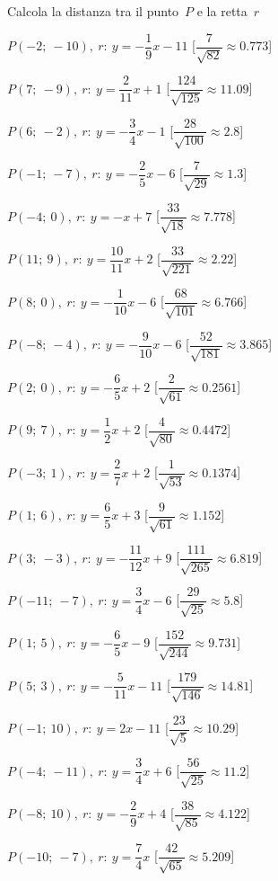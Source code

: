 \begin{esercizio}\label{ese:}
 Calcola la distanza tra il punto~$P$ e la retta~$r$
 \begin{enumeratea}
  \item  $P(-2;~-10),~r:~y = -\dfrac{1}{9} x -11$ \hfill 
   [$\dfrac{7}{\sqrt{82}}\approx 0.773$]
  \item  $P(7;~-9),~r:~y = \dfrac{2}{11} x +1$ \hfill 
   [$\dfrac{124}{\sqrt{125}}\approx 11.09$]
  \item  $P(6;~-2),~r:~y = -\dfrac{3}{4} x -1$ \hfill 
   [$\dfrac{28}{\sqrt{100}}\approx   2.8$]
  \item  $P(-1;~-7),~r:~y = -\dfrac{2}{5} x -6$ \hfill 
   [$\dfrac{7}{\sqrt{29}}\approx   1.3$]
  \item  $P(-4;~0),~r:~y = - x +7$ \hfill 
   [$\dfrac{33}{\sqrt{18}}\approx 7.778$]
  \item  $P(11;~9),~r:~y = \dfrac{10}{11} x +2$ \hfill 
   [$\dfrac{33}{\sqrt{221}}\approx  2.22$]
  \item  $P(8;~0),~r:~y = -\dfrac{1}{10} x -6$ \hfill 
   [$\dfrac{68}{\sqrt{101}}\approx 6.766$]
  \item  $P(-8;~-4),~r:~y = -\dfrac{9}{10} x -6$ \hfill 
   [$\dfrac{52}{\sqrt{181}}\approx 3.865$]
  \item  $P(2;~0),~r:~y = -\dfrac{6}{5} x +2$ \hfill 
   [$\dfrac{2}{\sqrt{61}}\approx0.2561$]
  \item  $P(9;~7),~r:~y = \dfrac{1}{2} x +2$ \hfill 
   [$\dfrac{4}{\sqrt{80}}\approx0.4472$]
  \item  $P(-3;~1),~r:~y = \dfrac{2}{7} x +2$ \hfill 
   [$\dfrac{1}{\sqrt{53}}\approx0.1374$]
  \item  $P(1;~6),~r:~y = \dfrac{6}{5} x +3$ \hfill 
   [$\dfrac{9}{\sqrt{61}}\approx 1.152$]
  \item  $P(3;~-3),~r:~y = -\dfrac{11}{12} x +9$ \hfill 
   [$\dfrac{111}{\sqrt{265}}\approx 6.819$]
  \item  $P(-11;~-7),~r:~y = \dfrac{3}{4} x -6$ \hfill 
   [$\dfrac{29}{\sqrt{25}}\approx   5.8$]
  \item  $P(1;~5),~r:~y = -\dfrac{6}{5} x -9$ \hfill 
   [$\dfrac{152}{\sqrt{244}}\approx 9.731$]
  \item  $P(5;~3),~r:~y = -\dfrac{5}{11} x -11$ \hfill 
   [$\dfrac{179}{\sqrt{146}}\approx 14.81$]
  \item  $P(-1;~10),~r:~y = 2 x -11$ \hfill 
   [$\dfrac{23}{\sqrt{5}}\approx 10.29$]
  \item  $P(-4;~-11),~r:~y = \dfrac{3}{4} x +6$ \hfill 
   [$\dfrac{56}{\sqrt{25}}\approx  11.2$]
  \item  $P(-8;~10),~r:~y = -\dfrac{2}{9} x +4$ \hfill 
   [$\dfrac{38}{\sqrt{85}}\approx 4.122$]
  \item  $P(-10;~-7),~r:~y = \dfrac{7}{4} x $ \hfill 
   [$\dfrac{42}{\sqrt{65}}\approx 5.209$]
 \end{enumeratea}
\end{esercizio}

